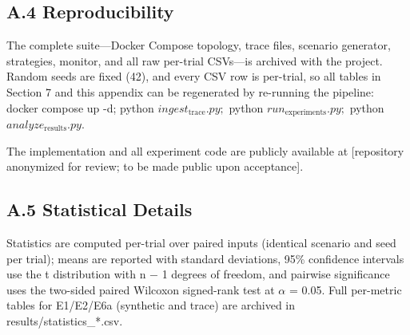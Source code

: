 \documentclass[11pt]{article}
\begin{document}
\subsection{A.4 Reproducibility}
The complete suite—Docker Compose topology, trace files, scenario generator, strategies, monitor, and all raw per-trial CSVs—is archived with the project. Random seeds are fixed (42), and every CSV row is per-trial, so all tables in Section 7 and this appendix can be regenerated by re-running the pipeline: docker compose up -d; python $ingest_{\mathrm{trace}}.py;$ python $run_{\mathrm{experiments}}.py;$ python $analyze_{\mathrm{results}}.py.$

The implementation and all experiment code are publicly available at [repository anonymized for review; to be made public upon acceptance].

\subsection{A.5 Statistical Details}
Statistics are computed per-trial over paired inputs (identical scenario and seed per trial); means are reported with standard deviations, 95\% confidence intervals use the t distribution with n $-$ 1 degrees of freedom, and pairwise significance uses the two-sided paired Wilcoxon signed-rank test at $\alpha $ = 0.05. Full per-metric tables for E1/E2/E6a (synthetic and trace) are archived in results/statistics\_*.csv.

\begin{table}[t]
\centering
\caption{Table A5. Synthetic E2 (N = 10, M = 24, n = 15, partial ballots obs = 0.9, no dissemination): ordering-information retention (1 $-$ $\protect\hat{\tau})$ by strategy—mean ± std, 95\% CI, and two-sided Wilcoxon p versus CF-RP.}
\label{tbl:12}
\end{table}
\end{document}
